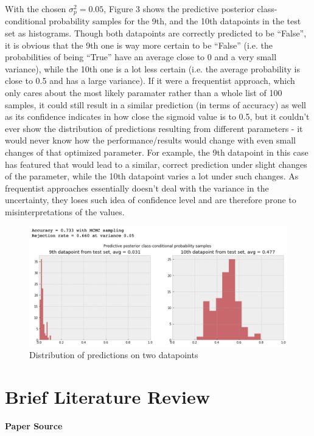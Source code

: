 \documentclass{article} %
\begin{document}
  With the chosen $\sigma^2_p = 0.05$, Figure 3 shows the  predictive posterior class-conditional probability samples for the 9th, and the 10th datapoints in the test set as histograms. Though both datapoints are correctly predicted to be ``False'', it is obvious that the 9th one is way more certain to be ``False'' (i.e. the probabilities of being ``True'' have an average close to 0 and a very small variance), while the 10th one is a lot less certain (i.e. the average probability is close to 0.5 and has a large variance). If it were a frequentist approach, which only cares about the most likely paramater rather than a whole list of 100 samples, it could still result in a similar prediction (in terms of accuracy) as well as its confidence indicates in how close the sigmoid value is to 0.5, but it couldn't ever show the distribution of predictions resulting from different parameters - it would never know how the performance/results would change with even small changes of that optimized parameter. For example, the 9th datapoint in this case has featured that would lead to a similar, correct prediction under slight changes of the parameter, while the 10th datapoint varies a lot under such changes. As frequentist approaches essentially doesn't deal with the variance in the uncertainty, they loses such idea of confidence level and are therefore prone to misinterpretations of the values.

  \begin{figure}[!h]
    \centering
    \includegraphics[width=0.85\linewidth]{A5_3.png}
    \caption{Distribution of predictions on two datapoints}
    \label{fig:4}
  \end{figure}


\vspace{0.3cm}
\section*{Brief Literature Review} %
{\large\textbf{Paper Source}}
\end{document}
